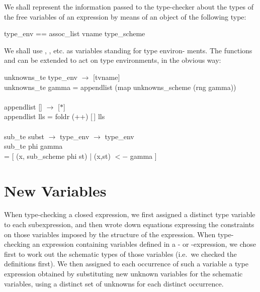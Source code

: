 We shall represent the information passed to the type-checker about the
types of the free variables of an expression by means of an object of the
following type:
\begin{mlcoded}
    type\_env == assoc\_list vname type\_scheme
\end{mlcoded}
We shall use , , etc. as variables standing for type environ-
ments. The functions  and  can be extended to
act on type environments, in the obvious way:
\begin{mlcoded}
    unknowns\_te \hastype{} type\_env $\rightarrow$ [tvname] \\
    unknowns\_te gamma = appendlist (map unknowns\_scheme (rng gamma))\\
\\
    appendlist \hastype{} [\;[$\ast$]\;] $\rightarrow$ [$\ast$] \\
    appendlist lls = foldr (++) [\,] lls\\
\\
    sub\_te \hastype{} subst $\rightarrow$ type\_env $\rightarrow$ type\_env \\
    sub\_te phi gamma \\
    \phantom{XXX} = [ (x, sub\_scheme phi st) | (x,st) $<-$ gamma ]
\end{mlcoded}

\section{New Variables}

When type-checking a closed expression, we first assigned a distinct type
variable to each subexpression, and then wrote down equations expressing
the constraints on those variables imposed by the structure of the expression.
When type-checking an expression containing variables defined in a - or
-expression, we chose first to work out the schematic types of those
variables (i.e.\ we checked the definitions first). We then assigned to each
occurrence of such a variable a type expression obtained by substituting new
unknown variables for the schematic variables, using a distinct set of
unknowns for each distinct occurrence.

